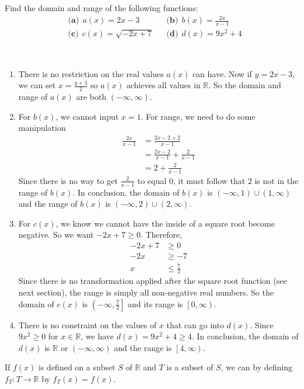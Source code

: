 \begin{exercise}
    Find the domain and range of the following functions:
    \begin{align*}
        &\textbf{(a)}\  \ a \left( x  \right) = 2x-3 &&\textbf{(b)}\  \ b(x) = \frac{2x}{x-1}\\
        &\textbf{(c)}\  \ c \left( x \right) = \sqrt{-2x+7} &&\textbf{(d)}\ \  d \left( x \right) = 9x^{2} +4
    \end{align*}
    
\end{exercise}
\begin{solution}
    $ $ \vspace{-1.5em}
    \begin{enumerate}[label=\textbf{\alph*)}]
        \item There is no restriction on the real values \( a(x) \) can have. Now if \( y = 2x-3 \), we can set \( x = \frac{y+3}{2} \) so \( a(x) \) achieves all values in \( \mathbb{R} \). So the domain and range of \( a(x) \) are both \( \left( - \infty, \infty \right) \). 
        \item For \( b(x) \), we cannot input \( x =1 \). For range, we need to do some manipulation 
        \begin{align*}
            \frac{2x}{x-1} &= \frac{2x -2 +2}{x-1} \tag*{Adding a special $0$ in the numerator.}\\
            &= \frac{2x-2}{x-1} + \frac{2}{x-1} \\
            &= 2 + \frac{2}{x-1}
        \end{align*}
        Since there is no way to get \( \frac{2}{x-1} \) to equal \( 0 \), it must follow that \( 2 \) is not in the range of \( b(x) \). In conclusion, the domain of \( b(x) \) is \( \left( - \infty, 1   \right) \cup \left( 1, \infty \right) \) and the range of \( b(x) \) is \( \left( - \infty, 2   \right) \cup \left( 2, \infty \right) \). \\ 
        \item For \( c(x) \), we know we cannot have the inside of a square root become negative. So we want \( -2x+7 \ge 0 \). Therefore, 
        \begin{align*}
            -2x+7 &\ge 0\\
            -2x &\ge -7 \\
            x &\le \frac{7}{2}
        \end{align*}
        Since there is no transformation applied after the square root function (see next section), the range is simply all non-negative real numbers. So the domain of \( c(x) \) is \( \left( - \infty, \frac{7}{2} \right] \) and its range is \( \left[ 0, \infty \right) \).
        \item There is no constraint on the values of \( x \) that can go into \( d \left( x \right) \). Since \( 9x^{2} \ge 0 \) for \( x \in \mathbb{R} \), we have \( d(x)=9x^{2}+4 \ge 4 \). In conclusion, the domain of \( d(x) \) is \( \mathbb{R} \) or \( \left( - \infty, \infty \right) \) and the range is \( \left[ 4, \infty \right) \).
    \end{enumerate}
\end{solution}

\begin{dfn}
    If \( f(x) \) is defined on a subset \( S \) of \( \mathbb{R} \) and \( T \) is a subset of \( S \), we can  by defining \( f_{T}: T \to \mathbb{R} \) by \( f_{T} \left( x \right) = f(x) \).
\end{dfn}